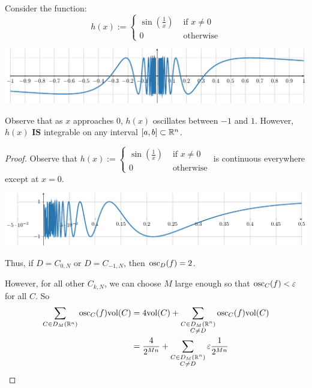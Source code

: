 \begin{example}

    \begin{proposition}
      Consider the function: $$h(x) := \left\{
		\begin{array}{ll}
			\sin(\frac{1}{x}) & \text{ if } x \neq 0 \\
			0 & \text{ otherwise}
		\end{array}
		\right.$$

    \begin{center}
        \includegraphics[scale=.7]{chapters/4-IntegrationRn/figures/figures-sin1x.pdf}
    \end{center}

    Observe that as $x$ approaches 0, $h(x)$ oscillates between $-1$ and $1$.  However, $h(x)$ \textbf{IS} integrable on any interval $[a,b] \subset \mathbb{R}^n$.  
    \end{proposition}
    
    \begin{proof}
     Observe that $h(x) := \left\{
		\begin{array}{ll}
			\sin(\frac{1}{x}) & \text{ if } x \neq 0 \\
			0 & \text{ otherwise}
		\end{array}
		\right.$  
is continuous everywhere except at $x=0$.  

    \begin{center}
        \includegraphics[scale=.7]{chapters/4-IntegrationRn/figures/figures-sin1xzoom.pdf}
    \end{center}

    Thus, if $D = C_{0,N}$ or $D=C_{-1,N}$, then $\textnormal{osc}_D(f) = 2$.

    However, for all other $C_{k,N}$, we can choose $M$ large enough so that $\textnormal{osc}_C(f) < \varepsilon$ for all $C$.  So
    \begin{align*}
    \sum_{C \in D_M(\mathbb{R}^n)} \textnormal{osc}_C(f) \textnormal{vol}(C) &= 4\textnormal{vol}(C) + \sum_{\substack{C \in D_M(\mathbb{R}^n) \\ C \neq D}} \textnormal{osc}_C(f) \textnormal{vol}(C)\\
    &= \frac{4}{2^{Mn}} + \sum_{\substack{C \in D_M(\mathbb{R}^n) \\ C \neq D}} \varepsilon \frac{1}{2^{Mn}}
    \end{align*}

    \end{proof}

\end{example}

